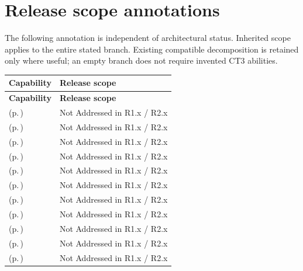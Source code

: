 \section{Release scope annotations}
The following annotation is independent of architectural status. Inherited scope applies to the entire stated branch. Existing compatible decomposition is retained only where useful; an empty branch does not require invented CT3 abilities.
\begingroup\small\setlength{\TableWidth}{\dimexpr\linewidth-4\tabcolsep-3\arrayrulewidth\relax}
\begin{longtable}{|>{\raggedright\arraybackslash}p{0.6\TableWidth}|>{\raggedright\arraybackslash}p{0.4\TableWidth}|}
\hline\rowcolor{TableHead}\textbf{Capability} & \textbf{Release scope}\\\hline\endfirsthead
\hline\rowcolor{TableHead}\textbf{Capability} & \textbf{Release scope}\\\hline\endhead
\hline\endfoot
\nameref{cap:bec-client-centred-administration} (p.\,\pageref{cap:bec-client-centred-administration}) & Not Addressed in R1.x / R2.x\\\hline
\nameref{cap:bec-episode-encounter-administration} (p.\,\pageref{cap:bec-episode-encounter-administration}) & Not Addressed in R1.x / R2.x\\\hline
\nameref{cap:bec-diagnostic-administration} (p.\,\pageref{cap:bec-diagnostic-administration}) & Not Addressed in R1.x / R2.x\\\hline
\nameref{cap:bec-medication-administration} (p.\,\pageref{cap:bec-medication-administration}) & Not Addressed in R1.x / R2.x\\\hline
\nameref{cap:bec-procedure-administration} (p.\,\pageref{cap:bec-procedure-administration}) & Not Addressed in R1.x / R2.x\\\hline
\nameref{cap:bec-clinical-communication-administration} (p.\,\pageref{cap:bec-clinical-communication-administration}) & Not Addressed in R1.x / R2.x\\\hline
\nameref{cap:bec-funding-coverage-administration} (p.\,\pageref{cap:bec-funding-coverage-administration}) & Not Addressed in R1.x / R2.x\\\hline
\nameref{cap:bec-clinical-charging-claims-administration} (p.\,\pageref{cap:bec-clinical-charging-claims-administration}) & Not Addressed in R1.x / R2.x\\\hline
\nameref{cap:bec-clinical-training-education} (p.\,\pageref{cap:bec-clinical-training-education}) & Not Addressed in R1.x / R2.x\\\hline
\nameref{cap:bec-reviewed-clinical-service-dependency-management} (p.\,\pageref{cap:bec-reviewed-clinical-service-dependency-management}) & Not Addressed in R1.x / R2.x\\\hline
\nameref{cap:bec-reviewed-service-establishment-support} (p.\,\pageref{cap:bec-reviewed-service-establishment-support}) & Not Addressed in R1.x / R2.x\\\hline
\end{longtable}\endgroup
